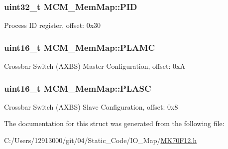 \subsubsection[{P\+I\+D}]{\setlength{\rightskip}{0pt plus 5cm}uint32\+\_\+t M\+C\+M\+\_\+\+Mem\+Map\+::\+P\+I\+D}\label{struct_m_c_m___mem_map_a41b1890f596f706bcd94c2d49c1e44f7}
Process I\+D register, offset\+: 0x30 \hypertarget{struct_m_c_m___mem_map_a7d749b910777a6b67ea94f2379c628ee}{}
\subsubsection[{P\+L\+A\+M\+C}]{\setlength{\rightskip}{0pt plus 5cm}uint16\+\_\+t M\+C\+M\+\_\+\+Mem\+Map\+::\+P\+L\+A\+M\+C}\label{struct_m_c_m___mem_map_a7d749b910777a6b67ea94f2379c628ee}
Crossbar Switch (A\+X\+B\+S) Master Configuration, offset\+: 0x\+A \hypertarget{struct_m_c_m___mem_map_ad68f64d82524bb0b181a837967b8e248}{}
\subsubsection[{P\+L\+A\+S\+C}]{\setlength{\rightskip}{0pt plus 5cm}uint16\+\_\+t M\+C\+M\+\_\+\+Mem\+Map\+::\+P\+L\+A\+S\+C}\label{struct_m_c_m___mem_map_ad68f64d82524bb0b181a837967b8e248}
Crossbar Switch (A\+X\+B\+S) Slave Configuration, offset\+: 0x8 

The documentation for this struct was generated from the following file\+:\begin{DoxyCompactItemize}
\item 
C\+:/\+Users/12913000/git/04/\+Static\+\_\+\+Code/\+I\+O\+\_\+\+Map/\hyperlink{_m_k70_f12_8h}{M\+K70\+F12.\+h}\end{DoxyCompactItemize}
